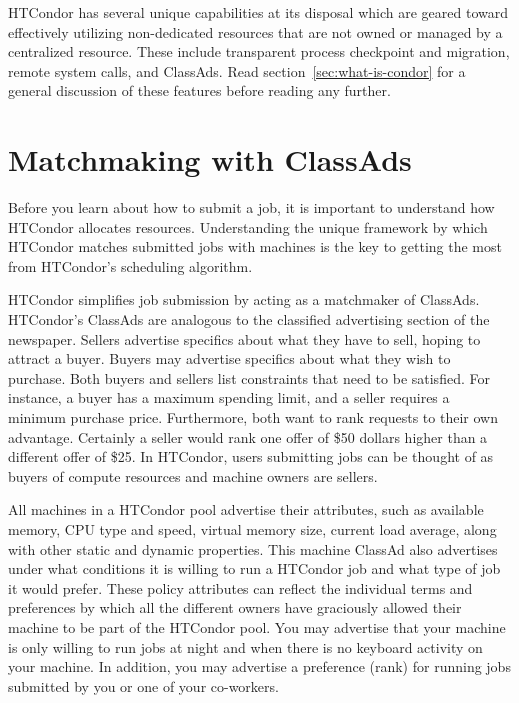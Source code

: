HTCondor has several unique capabilities at its disposal which are geared 
toward effectively utilizing non-dedicated resources that are not owned or
managed by a centralized resource. These include transparent process
checkpoint and migration, remote system calls, and ClassAds.
Read section~\ref{sec:what-is-condor} for a general 
discussion of these features before reading any further.


\section{Matchmaking with ClassAds}
\label{sec:matchmaking-with-classads}

Before you learn about how to submit a job, it is important to
understand how HTCondor allocates resources. 
Understanding the
unique framework by which HTCondor matches submitted jobs with machines is
the key to getting the most from HTCondor's scheduling algorithm. 

HTCondor simplifies job submission by acting as a matchmaker of ClassAds.
HTCondor's ClassAds
are analogous to the classified advertising section of the
newspaper. Sellers advertise specifics about what they have to sell,
hoping to attract a buyer. Buyers may advertise specifics about what
they wish to purchase. Both buyers and sellers list constraints that
need to be satisfied.
For instance, a buyer has a maximum spending limit, 
and a seller requires a minimum purchase price.
Furthermore, both want to rank requests to their own advantage.
Certainly a seller would rank
one offer of \$50 dollars higher than a different
offer of \$25.
In HTCondor, users submitting
jobs can be thought of as buyers of compute resources and machine owners
are sellers. 

All machines in a HTCondor pool advertise their attributes,
such as
available memory, CPU type and speed, virtual memory size, current
load average, along with other static and dynamic properties.
This machine ClassAd
also advertises under what conditions it is
willing to run a HTCondor job and what type of job it would prefer. These
policy attributes can reflect the individual terms and preferences by
which all the different owners have graciously allowed their machine to
be part of the HTCondor pool. 
You may
advertise that your machine is only willing to run jobs at night
and when there is no keyboard activity on your machine.
In addition, you may
advertise a preference (rank) for running jobs submitted by you
or one of your co-workers. 


